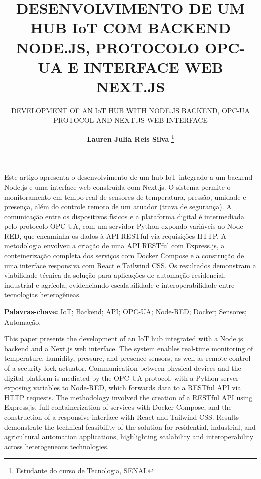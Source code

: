 \documentclass[12pt]{unisenaiclass}
\title{DESENVOLVIMENTO DE UM HUB IoT COM BACKEND NODE.JS, PROTOCOLO OPC-UA E INTERFACE WEB NEXT.JS}
\subtitle{DEVELOPMENT OF AN IoT HUB WITH NODE.JS BACKEND, OPC-UA PROTOCOL AND NEXT.JS WEB INTERFACE}
\author{
  \textbf{Lauren Julia Reis Silva} \thanks{Estudante do curso de Tecnologia, SENAI.}
}
\begin{document}
\maketitle

\begin{resumo}
Este artigo apresenta o desenvolvimento de um hub IoT integrado a um backend Node.js e
uma interface web construída com Next.js. O sistema permite o monitoramento em tempo real
de sensores de temperatura, pressão, umidade e presença, além do controle remoto de um
atuador (trava de segurança). A comunicação entre os dispositivos físicos e a plataforma
digital é intermediada pelo protocolo OPC-UA, com um servidor Python expondo variáveis
ao Node-RED, que encaminha os dados à API RESTful via requisições HTTP. A metodologia
envolveu a criação de uma API RESTful com Express.js, a conteinerização completa dos
serviços com Docker Compose e a construção de uma interface responsiva com React e Tailwind
CSS. Os resultados demonstram a viabilidade técnica da solução para aplicações de automação
residencial, industrial e agrícola, evidenciando escalabilidade e interoperabilidade entre
tecnologias heterogêneas.
\end{resumo}

\begin{justify}
\textbf{Palavras-chave:} IoT; Backend; API; OPC-UA; Node-RED; Docker; Sensores; Automação.
\end{justify}

\begin{abstract1}
This paper presents the development of an IoT hub integrated with a Node.js backend and a
Next.js web interface. The system enables real-time monitoring of temperature, humidity,
pressure, and presence sensors, as well as remote control of a security lock actuator.
Communication between physical devices and the digital platform is mediated by the OPC-UA
protocol, with a Python server exposing variables to Node-RED, which forwards data to a
RESTful API via HTTP requests. The methodology involved the creation of a RESTful API using
Express.js, full containerization of services with Docker Compose, and the construction of
a responsive interface with React and Tailwind CSS. Results demonstrate the technical
feasibility of the solution for residential, industrial, and agricultural automation
applications, highlighting scalability and interoperability across heterogeneous technologies.
\end{abstract1}
\end{document}
